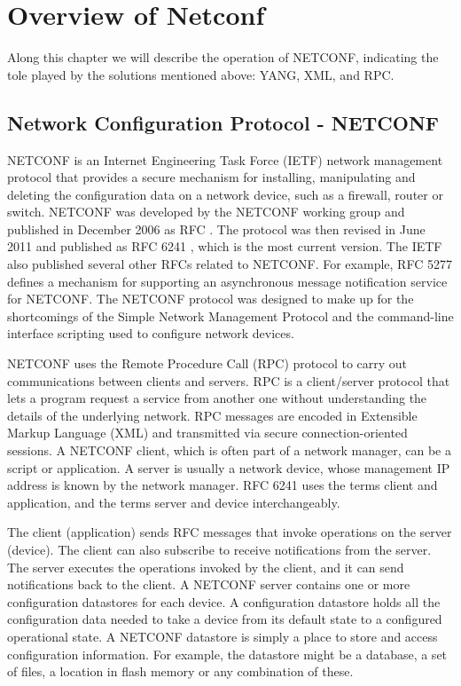 \chapter{Overview of Netconf}

Along this chapter we will describe the operation of \gls{NETCONF}, indicating the tole played by the solutions mentioned above: \gls{YANG}, \gls{XML}, and \gls{RPC}.  

\section{Network Configuration Protocol - NETCONF}

\gls{NETCONF} is an Internet Engineering Task Force (IETF) network management protocol that provides a secure mechanism for installing, manipulating and deleting the configuration data on a network device, such as a firewall, router or switch.
NETCONF was developed by the NETCONF working group and published in December 2006 as RFC \cite{rfc4741}. The protocol was then revised in June 2011 and published as RFC 6241 \cite{rfc6241}, which is the most current version. The IETF also published several other RFCs related to NETCONF. For example, RFC 5277 \cite{rfc5277} defines a mechanism for supporting an asynchronous message notification service for NETCONF.
The NETCONF protocol was designed to make up for the shortcomings of the Simple Network Management Protocol and the command-line interface scripting used to configure network devices.

NETCONF uses the Remote Procedure Call (RPC) protocol to carry out communications between clients and servers. RPC is a client/server protocol that lets a program request a service from another one without understanding the details of the underlying network. RPC messages are encoded in Extensible Markup Language (XML) and transmitted via secure connection-oriented sessions.
A NETCONF client, which is often part of a network manager, can be a script or application. A server is usually a network device, whose management IP address is known by the network manager. RFC 6241 uses the terms client and application, and the terms server and device interchangeably.

The client (application) sends RFC messages that invoke operations on the server (device). The client can also subscribe to receive notifications from the server. The server executes the operations invoked by the client, and it can send notifications back to the client. A NETCONF server contains one or more configuration datastores for each device. A configuration datastore holds all the configuration data needed to take a device from its default state to a configured operational state. A NETCONF datastore is simply a place to store and access configuration information. For example, the datastore might be a database, a set of files, a location in flash memory or any combination of these.
\pagebreak

